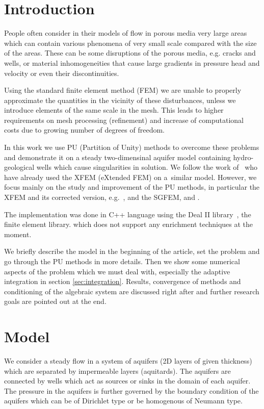 \documentclass[preprint,12pt,authoryear]{elsarticle}
\begin{document}

\section{Introduction}
\label{sec:introduction}

People often consider in their models of flow in porous media very large areas which can contain various 
phenomena of very small scale compared with the size of the areas. These can be some disruptions of the porous 
media, e.g. cracks and wells, or material inhomogeneities that cause large gradients in pressure head and 
velocity or even their discontinuities.

Using the standard finite element method (FEM) we are unable to properly approximate the quantities in the 
vicinity of these disturbances, unless we introduce elements of the same scale in the mesh. This leads to 
higher requirements on mesh processing (refinement) and increase of computational costs due to growing number  
of degrees of freedom.

In this work we use PU (Partition of Unity) methods to overcome these problems and demonstrate it on a steady 
two-dimensinal aquifer model containing hydro-geological wells which cause singularities in solution. 
We follow the work of~\cite{gracie} who have already used the XFEM (eXtended FEM) on a~similar model. 
However, we focus mainly on the study and improvement of the PU methods, in particular the XFEM and its 
corrected version, e.g.~\cite{cxfem},  and the SGFEM, \cite{sgfem} and \cite{sgfem2013}. 
 
The implementation was done in C++ language using the Deal II library~\citep{deal}, the finite element library.
which does not support any enrichment techniques at the moment.

We briefly describe the model in the beginning of the article, set the problem and go through the
PU methods in more details. Then we show some numerical aspects of the problem which we must deal with, 
especially the adaptive integration in section \ref{sec:integration}. Results, convergence of methods and
conditioning of the algebraic system are discussed right after and further research goals are pointed out 
at the end. 

\section{Model}
\label{sec:model}
We consider a steady flow in a system of aquifers (2D layers of given thickness) which are separated by 
impermeable layers (aquitards). The aquifers are connected by wells which act as sources
or sinks in the domain of each aquifer. The pressure in the aquifers is further governed by the boundary 
condition of the aquifers which can be of Dirichlet type or be homogenous of Neumann type.
\end{document}
